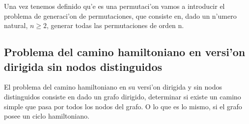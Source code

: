\documentclass[12pt]{article}
\begin{document}
Una vez tenemos definido qu'e es una permutaci'on vamos a introducir el problema de generaci'on de
permutaciones, que consiste en, dado un n'umero natural, $n \geq 2$, generar todas las permutaciones de orden n.



\subsection{Problema del camino hamiltoniano en versi'on dirigida sin nodos distinguidos}

El problema del camino hamiltoniano en su versi'on dirigida y sin nodos distinguidos consiste en
dado un grafo dirigido, determinar si existe un camino simple que pasa por todos los nodos del grafo. O lo
que es lo mismo, si el grafo posee un ciclo hamiltoniano.

\printbibliography
\end{document}
